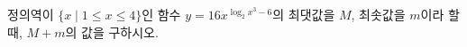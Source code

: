정의역이 $\{x \mid 1\le x\le 4\}$인 함수 $y=16x^{\log_2 x^3-6}$의 최댓값을 $M$, 최솟값을 $m$이라 할 때, $M+m$의 값을 구하시오.
